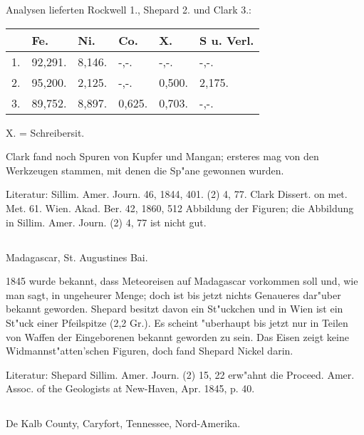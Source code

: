 \documentclass[a4paper, 11pt, oneside]{article}
\begin{document}
Analysen lieferten Rockwell 1., Shepard 2. und Clark 3.:
\begin{table}[H]
    \centering\swabfamily\Large
    \begin{tabular}{l l l l l l}
         & Fe. & Ni. & Co. & X. & S u. Verl. \\ \hline
        1. & 92,291. & 8,146. & -,-. & -,-. & -,-. \\
        2. & 95,200. & 2,125. & -,-. & 0,500. & 2,175. \\
        3. & 89,752. & 8,897. & 0,625. & 0,703. & -,-. \\
    \end{tabular}
\end{table}

X. = Schreibersit.

Clark fand noch Spuren von Kupfer und Mangan; ersteres mag von den Werkzeugen stammen, mit denen die Sp"ane gewonnen wurden.

\normalsize
Literatur: Sillim. Amer. Journ. 46, 1844, 401. (2) 4, 77. Clark Dissert. on met. Met. 61. Wien. Akad. Ber. 42, 1860, 512 Abbildung der Figuren; die Abbildung in Sillim. Amer. Journ. (2) 4, 77 ist nicht gut.

\subsection{}
\LARGE
\paragraph{}
Madagascar, St. Augustines Bai.

1845 wurde bekannt, dass Meteoreisen auf Madagascar vorkommen soll und, wie man sagt, in ungeheurer Menge; doch ist bis jetzt nichts Genaueres dar"uber bekannt geworden. Shepard besitzt davon ein St"uckchen und in Wien ist ein St"uck einer Pfeilspitze (2,2 Gr.). Es scheint "uberhaupt bis jetzt nur in Teilen von Waffen der Eingeborenen bekannt geworden zu sein. Das Eisen zeigt keine Widmannst"atten'schen Figuren, doch fand Shepard Nickel darin.

\normalsize
Literatur: Shepard Sillim. Amer. Journ. (2) 15, 22 erw"ahnt die Proceed. Amer. Assoc. of the Geologists at New-Haven, Apr. 1845, p. 40.

\subsection{}
\LARGE
\paragraph{}
De Kalb County, Caryfort, Tennessee, Nord-Amerika.
\end{document}
